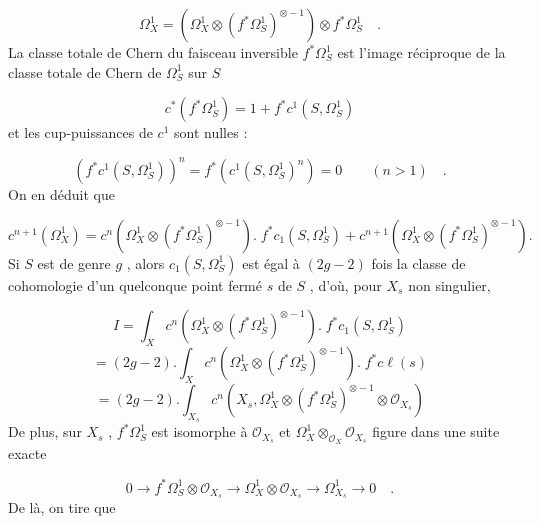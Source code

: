 \begin{equation*}
\Omega_X^1=\left(\Omega_X^1\otimes(f^*\Omega_S^1)^{\otimes-1}\right)\otimes f^*\Omega_S^1 \quad .
\end{equation*}
La classe totale de Chern du faisceau inversible $f^*\Omega_S^1$ est l'image réciproque de la classe totale de Chern de $\Omega_S^1$ sur $S$



\begin{equation*}
 c^{*}(f^{*} \Omega^{1}_{S}) = 1 + f^{*}c^{1}(S,\Omega^{1}_{S})
\end{equation*}
et les cup-puissances de $c^{1}$ sont nulles :

\begin{equation*}
(f^{*} c^{1}(S,\Omega^{1}_{S}))^{n} = f^{*}(c^{1}(S,\Omega^{1}_{S})^{n}) = 0 \qquad (n > 1) \quad .
\end{equation*}
On en déduit que

\begin{equation*}
c^{n+1}(\Omega^{1}_{X}) = c^{n}(\Omega^{1}_{X} \otimes (f^{*}\Omega^{1}_{S})^{\otimes -1}) . \; f^{*}c_{1}(S,\Omega^{1}_{S}) + c^{n+1}(\Omega^{1}_{X} \otimes (f^{*} \Omega^{1}_{S})^{\otimes -1}) .
\end{equation*}
Si $S$ est de genre $g$ , alors $c_{1}(S,\Omega^{1}_{S})$ est égal à $(2g - 2)$ fois la classe de cohomologie d'un quelconque point fermé $s$ de $S$ , d'où, pour $X_{s}$ non singulier,

\begin{equation*}
I = \int_{X} c^{n}(\Omega^{1}_{X} \otimes (f^{*} \Omega^{1}_{S})^{\otimes -1}) . \; f^{*}c_{1}(S,\Omega^{1}_{S})
\end{equation*}
\begin{equation*}
= (2g-2) . \int_{X} c^{n}(\Omega^{1}_{X} \otimes (f^{*} \Omega^{1}_{S})^{\otimes -1}) . \; f^{*}c\ell(s)
\end{equation*}
\begin{equation*}
= (2g-2) . \int_{X_{s}} c^{n}(X_{s},\Omega^{1}_{X} \otimes (f^{*} \Omega^{1}_{S})^{\otimes -1} \otimes \mathcal{O}_{X_{s}})
\end{equation*}
De plus, sur $X_{s}$ , $f^{*}\Omega^{1}_{S}$ est isomorphe à $\mathcal{O}_{X_{s}}$ et $\Omega^{1}_{X} \otimes_{\mathcal{O}_{X}} \mathcal{O}_{X_{s}}$ figure dans une suite exacte

\begin{equation*}
0 \to f^{*}\Omega^{1}_{S} \otimes \mathcal{O}_{X_{s}} \to \Omega^{1}_{X} \otimes \mathcal{O}_{X_{s}} \to \Omega^{1}_{X_{s}} \to 0 \quad .
\end{equation*}
De là, on tire que

